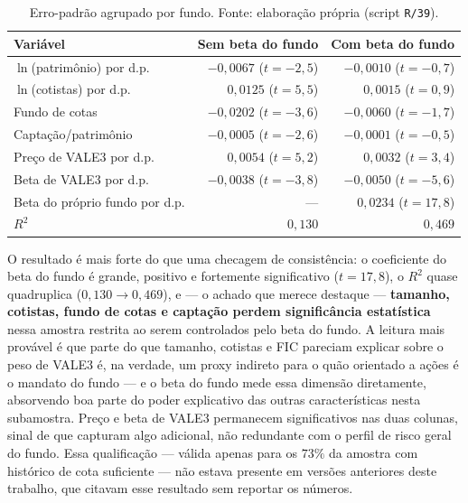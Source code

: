 \documentclass[12pt,a4paper]{article}
\begin{document}
\begin{table}[h]\centering\small
\caption{Regressão empilhada, mesma amostra ($n=8.333$), sem e com o beta do próprio fundo.}
\label{tab:betafundo}
\begin{tabular}{@{}lrr@{}}
\toprule
Variável & Sem beta do fundo & Com beta do fundo \\
\midrule
$\ln$(patrimônio) por d.p. & $-0{,}0067$ ($t=-2{,}5$) & $-0{,}0010$ ($t=-0{,}7$) \\
$\ln$(cotistas) por d.p.   & $0{,}0125$ ($t=5{,}5$)   & $0{,}0015$ ($t=0{,}9$) \\
Fundo de cotas              & $-0{,}0202$ ($t=-3{,}6$) & $-0{,}0060$ ($t=-1{,}7$) \\
Captação/patrimônio        & $-0{,}0005$ ($t=-2{,}6$) & $-0{,}0001$ ($t=-0{,}5$) \\
Preço de VALE3 por d.p.    & $0{,}0054$ ($t=5{,}2$)   & $0{,}0032$ ($t=3{,}4$) \\
Beta de VALE3 por d.p.     & $-0{,}0038$ ($t=-3{,}8$) & $-0{,}0050$ ($t=-5{,}6$) \\
Beta do próprio fundo por d.p. & --- & $0{,}0234$ ($t=17{,}8$) \\
\midrule
$R^2$ & $0{,}130$ & $0{,}469$ \\
\bottomrule
\end{tabular}
\caption*{\footnotesize Erro-padrão agrupado por fundo. Fonte: elaboração própria (script
\texttt{R/39}).}
\end{table}

O resultado é mais forte do que uma checagem de consistência: o coeficiente do beta do fundo é
grande, positivo e fortemente significativo ($t=17{,}8$), o $R^2$ quase quadruplica
($0{,}130\to0{,}469$), e --- o achado que merece destaque --- \textbf{tamanho, cotistas, fundo de
cotas e captação perdem significância estatística} nessa amostra restrita ao serem controlados
pelo beta do fundo. A leitura mais provável é que parte do que tamanho, cotistas e FIC pareciam
explicar sobre o peso de VALE3 é, na verdade, um proxy indireto para o quão orientado a ações é o
mandato do fundo --- e o beta do fundo mede essa dimensão diretamente, absorvendo boa parte do
poder explicativo das outras características nesta subamostra. Preço e beta de VALE3 permanecem
significativos nas duas colunas, sinal de que capturam algo adicional, não redundante com o perfil
de risco geral do fundo. Essa qualificação --- válida apenas para os $73\%$ da amostra com
histórico de cota suficiente --- não estava presente em versões anteriores deste trabalho, que
citavam esse resultado sem reportar os números.
\end{document}
